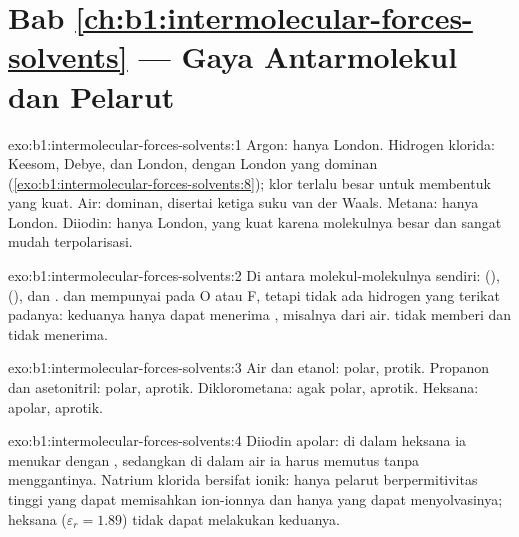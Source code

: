 \section*{Bab \ref{ch:b1:intermolecular-forces-solvents} --- Gaya Antarmolekul dan Pelarut}

\begin{solution}{exo:b1:intermolecular-forces-solvents:1}
Argon: hanya London. Hidrogen klorida: Keesom, Debye, dan London, dengan
London yang dominan (\cref{exo:b1:intermolecular-forces-solvents:8});
klor terlalu besar untuk membentuk  yang kuat. Air:  dominan, disertai ketiga suku van der Waals. Metana: hanya
London. Diiodin: hanya London, yang kuat karena molekulnya besar dan
sangat mudah terpolarisasi.
\end{solution}

\begin{solution}{exo:b1:intermolecular-forces-solvents:2}
Di antara molekul-molekulnya sendiri:  (), 
(), dan .  dan  mempunyai  pada O atau F, tetapi tidak ada hidrogen yang terikat
padanya: keduanya hanya dapat menerima , misalnya dari
air.  tidak memberi dan tidak menerima.
\end{solution}

\begin{solution}{exo:b1:intermolecular-forces-solvents:3}
Air dan etanol: polar, protik. Propanon dan asetonitril: polar, aprotik.
Diklorometana: agak polar, aprotik. Heksana: apolar, aprotik.
\end{solution}

\begin{solution}{exo:b1:intermolecular-forces-solvents:4}
Diiodin apolar: di dalam heksana ia menukar  dengan
, sedangkan di dalam air ia harus memutus 
tanpa menggantinya. Natrium klorida bersifat ionik: hanya pelarut
berpermitivitas tinggi yang dapat memisahkan ion-ionnya dan hanya
 yang dapat menyolvasinya; heksana ($\varepsilon_r = 1.89$)
tidak dapat melakukan keduanya.
\end{solution}

